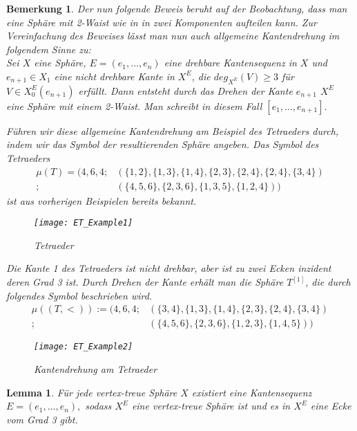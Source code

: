 \documentclass[12pt,titlepage,twoside,cleardoublepage]{article}
\theoremstyle{nummermitklammern}
\newtheorem{lemma}[temp]{Lemma}
\newtheorem{bemerkung}[temp]{Bemerkung}
\newtheorem{lemma}[zahl]{Lemma}
\newtheorem{bemerkung}[zahl]{Bemerkung}
\numberwithin{equation}{section}
\begin{document}
\begin{bemerkung}
Der nun folgende Beweis beruht auf der Beobachtung, dass man eine Sphäre mit 2-Waist wie in  in zwei Komponenten aufteilen kann. Zur Vereinfachung des Beweises lässt man nun auch allgemeine Kantendrehung im folgendem Sinne zu: \\
Sei $X$ eine Sphäre, $E=(e_1,\ldots,e_n)$ eine drehbare Kantensequenz in $X$ und $e_{n+1}\in X_1$ eine nicht drehbare Kante in $X^E$, die $deg_{X^E}(V)\geq 3 $ für $V\in X^E_0(e_{n+1})$ erfüllt. Dann entsteht durch das Drehen der Kante $e_{n+1}$ $X^E$ eine Sphäre mit einem 2-Waist. Man schreibt in diesem Fall $[e_1,\ldots,e_{n+1}].$

 Führen wir diese allgemeine Kantendrehung am Beispiel des Tetraeders durch, indem wir das Symbol der resultierenden Sphäre angeben. Das Symbol des Tetraeders
\begin{align*}
\mu(T)=(4,6,4;&(\{1,2\}, \{1,3\},\{1,4\},\{2,3\},\{2,4\},\{2,4\},\{3,4\})\\
;&(\{4,5,6\},\{2,3,6\},\{1,3,5\},\{1,2,4\}))
\end{align*} ist aus vorherigen Beispielen bereits bekannt.
\begin{figure}[H]
\begin{center}
\texttt{[image: ET\_Example1]}
\end{center}
\caption{Tetraeder}
\end{figure}
Die Kante 1 des Tetraeders ist nicht drehbar, aber ist zu zwei Ecken inzident deren Grad 3 ist. Durch Drehen der Kante erhält man die Sphäre $T^{[1]}$, die durch folgendes Symbol beschrieben wird.
\begin{align*}
\mu ((T,<)):=(4,6,4;&(\{3,4\},\{1,3\},\{1,4\},\{2,3\},\{2,4\},\{3,4\})\\
;&(\{4,5,6\},\{2,3,6\},\{1,2,3\},\{1,4,5\}))
\end{align*}
\begin{figure}[H]
\begin{center}
\texttt{[image: ET\_Example2]}
\end{center}
\caption{Kantendrehung am Tetraeder}
\end{figure}

\end{bemerkung}
\begin{lemma}\label{grad3}
Für  jede vertex-treue Sphäre $X$ existiert eine Kantensequenz $E=(e_1,\ldots,e_n),$ sodass $X^E$ eine vertex-treue Sphäre ist und es in $X^E$ eine Ecke vom Grad 3 gibt.
\end{lemma}
\end{document}
